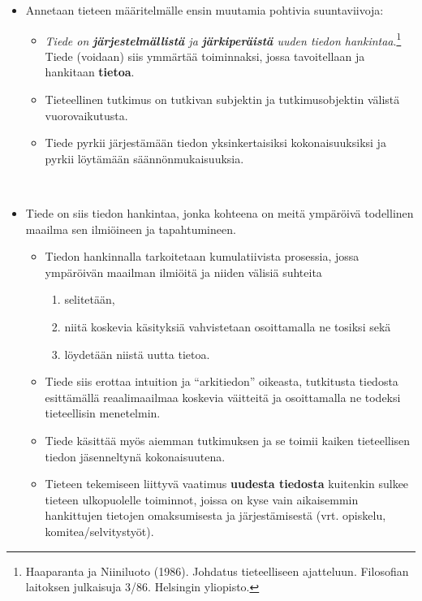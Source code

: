 \documentclass[
]{book}
\providecommand{\tightlist}{%
  \setlength{\itemsep}{0pt}\setlength{\parskip}{0pt}}
\begin{document}
\begin{itemize}
\tightlist
\item
  Annetaan tieteen määritelmälle ensin muutamia pohtivia suuntaviivoja:

  \begin{itemize}
  \tightlist
  \item
    \emph{Tiede on \textbf{järjestelmällistä} ja \textbf{järkiperäistä} uuden tiedon hankintaa}.\footnote{Haaparanta ja Niiniluoto (1986). Johdatus tieteelliseen ajatteluun. Filosofian laitoksen julkaisuja 3/86. Helsingin yliopisto.} Tiede (voidaan) siis ymmärtää toiminnaksi, jossa tavoitellaan ja hankitaan \textbf{tietoa}.
  \item
    Tieteellinen tutkimus on tutkivan subjektin ja tutkimusobjektin välistä vuorovaikutusta.
  \item
    Tiede pyrkii järjestämään tiedon yksinkertaisiksi kokonaisuuksiksi ja pyrkii löytämään säännönmukaisuuksia.\\
    \strut \\
  \end{itemize}
\item
  Tiede on siis tiedon hankintaa, jonka kohteena on meitä ympäröivä todellinen maailma sen ilmiöineen ja tapahtumineen.

  \begin{itemize}
  \tightlist
  \item
    Tiedon hankinnalla tarkoitetaan kumulatiivista prosessia, jossa ympäröivän maailman ilmiöitä ja niiden välisiä suhteita

    \begin{enumerate}
    \def\labelenumi{\roman{enumi})}
    \tightlist
    \item
      selitetään,
    \item
      niitä koskevia käsityksiä vahvistetaan osoittamalla ne tosiksi sekä
    \item
      löydetään niistä uutta tietoa.
    \end{enumerate}
  \item
    Tiede siis erottaa intuition ja ``arkitiedon'' oikeasta, tutkitusta tiedosta esittämällä reaalimaailmaa koskevia väitteitä ja osoittamalla ne todeksi tieteellisin menetelmin.
  \item
    Tiede käsittää myös aiemman tutkimuksen ja se toimii kaiken tieteellisen tiedon jäsenneltynä kokonaisuutena.
  \item
    Tieteen tekemiseen liittyvä vaatimus \textbf{uudesta tiedosta} kuitenkin sulkee tieteen ulkopuolelle toiminnot, joissa on kyse vain aikaisemmin hankittujen tietojen omaksumisesta ja järjestämisestä (vrt. opiskelu, komitea/selvitystyöt).


\end{itemize}
\end{itemize}
\end{document}
